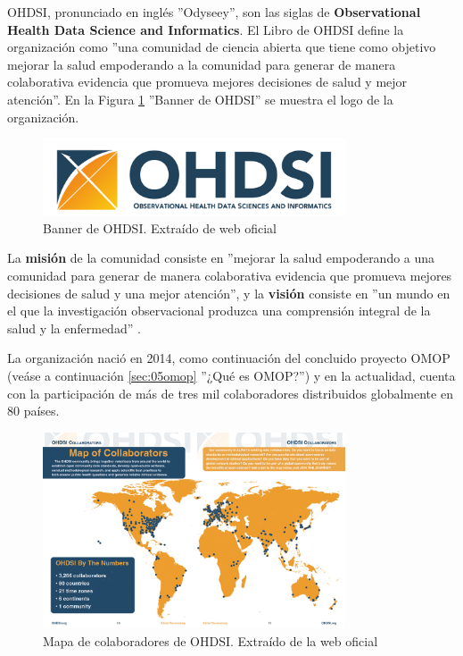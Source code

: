 OHDSI, pronunciado en inglés ''Odyseey'', son las siglas de \textbf{Observational Health Data Science and Informatics}. El Libro de OHDSI \cite{OHDSIbook} define la organización como ''una comunidad de ciencia abierta que tiene como objetivo mejorar la salud empoderando a la comunidad para generar de manera colaborativa evidencia que promueva mejores decisiones de salud y mejor atención''. En la Figura \ref{fig:OHDSIbanner} ''Banner de OHDSI'' se muestra el logo de la organización.

\begin{figure}[H]
    \centering
    \includegraphics[width=0.80\textwidth]{figures/OHDSIbanner.png}
    \caption{Banner de OHDSI. Extraído de web oficial \cite{OHDSIwebsite}}
    \label{fig:OHDSIbanner}
\end{figure}

La \textbf{misión} de la comunidad consiste en ''mejorar la salud empoderando a una comunidad para generar de manera colaborativa evidencia que promueva mejores decisiones de salud y una mejor atención'', y la \textbf{visión} consiste en ''un mundo en el que la investigación observacional produzca una comprensión integral de la salud y la enfermedad'' \cite{OHDSIwebsite}\cite{OHDSIbook}. 

La organización nació en 2014, como continuación del concluido proyecto OMOP (veáse a continuación \ref{sec:05omop} ''¿Qué es OMOP?'') y en la actualidad, cuenta con la participación de más de tres mil colaboradores distribuidos globalmente en 80 países.

\begin{figure}[H]
    \centering
    \includegraphics[width=0.80\textwidth]{figures/OHDSIcollaborators.png}
     \caption{Mapa de colaboradores de OHDSI. Extraído de la web oficial \cite{OHDSIwebsite}}
    \label{fig:OHDSIcollaborators}
\end{figure}

